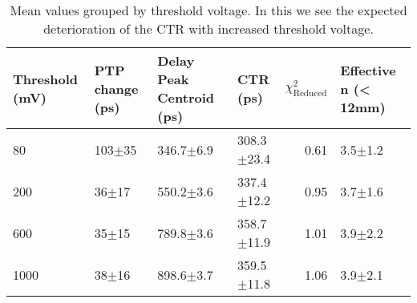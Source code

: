 \begin{table}
\caption{\label{tab:thresholdtest} Mean values grouped by threshold voltage. In this we see the expected deterioration of the CTR with increased threshold voltage.}
\begin{tabular}{llllrl}
\hline
Threshold (mV) & PTP change (ps) & Delay Peak Centroid (ps) & CTR (ps) & $\chi^2_\text{Reduced}$ & Effective n (< 12mm)\\
\hline
80        &  103$\pm$35 &  346.7$\pm$6.9 &  308.3$\pm$23.4 &        0.61 & 3.5$\pm$1.2 \\
200       &   36$\pm$17 &  550.2$\pm$3.6 &  337.4$\pm$12.2 &        0.95 & 3.7$\pm$1.6 \\
600       &   35$\pm$15 &  789.8$\pm$3.6 &  358.7$\pm$11.9 &        1.01 & 3.9$\pm$2.2 \\
1000      &   38$\pm$16 &  898.6$\pm$3.7 &  359.5$\pm$11.8 &        1.06 & 3.9$\pm$2.1 \\
\hline
\end{tabular}
\end{table}